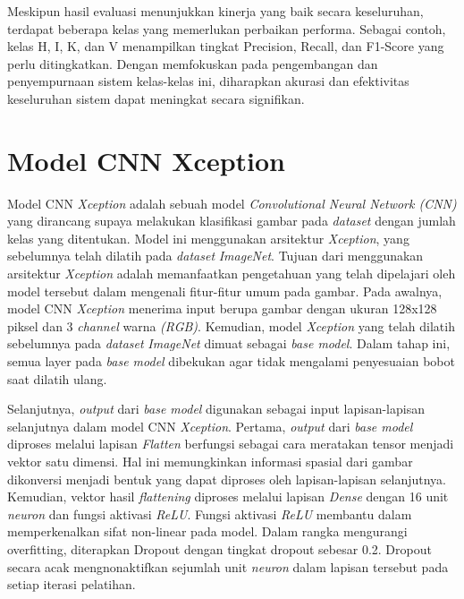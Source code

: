 Meskipun hasil evaluasi menunjukkan kinerja yang baik secara keseluruhan, terdapat beberapa kelas yang memerlukan perbaikan performa. Sebagai contoh, kelas H, I, K, dan V menampilkan tingkat Precision, Recall, dan F1-Score yang perlu ditingkatkan. Dengan memfokuskan pada pengembangan dan penyempurnaan sistem kelas-kelas ini, diharapkan akurasi dan efektivitas keseluruhan sistem dapat meningkat secara signifikan.

\section{Model CNN Xception}
Model CNN \textit{Xception} adalah sebuah model \textit{Convolutional Neural Network (CNN)} yang dirancang supaya melakukan klasifikasi gambar pada \textit{dataset} dengan jumlah kelas yang ditentukan. Model ini menggunakan arsitektur \textit{Xception}, yang sebelumnya telah dilatih pada \textit{dataset} \textit{ImageNet}. Tujuan dari menggunakan arsitektur \textit{Xception} adalah  memanfaatkan pengetahuan yang telah dipelajari oleh model tersebut dalam mengenali fitur-fitur umum pada gambar. Pada awalnya, model CNN \textit{Xception} menerima input berupa gambar dengan ukuran 128x128 piksel dan 3 \textit{channel} warna \textit{(RGB)}. Kemudian, model \textit{Xception} yang telah dilatih sebelumnya pada \textit{dataset} \textit{ImageNet} dimuat sebagai \textit{base model}. Dalam tahap ini, semua layer pada \textit{base model} dibekukan agar tidak mengalami penyesuaian bobot saat dilatih ulang.

Selanjutnya, \textit{output} dari \textit{base model} digunakan sebagai input lapisan-lapisan selanjutnya dalam model CNN \textit{Xception}. Pertama, \textit{output} dari \textit{base model} diproses melalui lapisan \textit{Flatten} berfungsi sebagai cara meratakan tensor menjadi vektor satu dimensi. Hal ini memungkinkan informasi spasial dari gambar dikonversi menjadi bentuk yang dapat diproses oleh lapisan-lapisan selanjutnya. Kemudian, vektor hasil \textit{flattening} diproses melalui lapisan \textit{Dense} dengan 16 unit \textit{neuron} dan fungsi aktivasi \textit{ReLU}. Fungsi aktivasi \textit{ReLU} membantu dalam memperkenalkan sifat non-linear pada model. Dalam rangka mengurangi overfitting, diterapkan Dropout dengan tingkat dropout sebesar 0.2. Dropout secara acak mengnonaktifkan sejumlah unit \textit{neuron} dalam lapisan tersebut pada setiap iterasi pelatihan.

